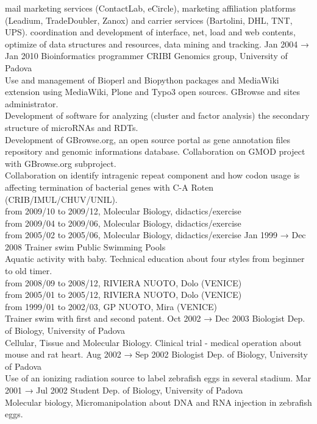 \documentclass[8pt]{stackoverflow-upgraded-version} %
\begin{document}
\begin{entrylist}
{		mail marketing services (ContactLab, eCircle), marketing affiliation platforms (Leadium, TradeDoubler, Zanox) and carrier services (Bartolini, DHL, TNT, UPS).
		 coordination and development of interface, net, load and web contents, optimize of data structures and resources, data mining and tracking.}
	\entry
		{Jan 2004 → Jan 2010}
		{Bioinformatics programmer}
		{CRIBI Genomics group, University of Padova}
		{\\
		Use and management of Bioperl and Biopython packages and MediaWiki extension using MediaWiki, Plone and Typo3 open sources. GBrowse and sites administrator.\\
		Development of software for analyzing (cluster and factor analysis) the secondary structure of microRNAs and RDTs.\\
		Development of GBrowse.org, an open source portal as gene annotation files repository and genomic informations database.
		Collaboration on GMOD project with GBrowse.org subproject.\\
		Collaboration on identify intragenic repeat component and how codon usage is affecting termination of bacterial genes with C-A Roten (CRIB/IMUL/CHUV/UNIL).\\
		from 2009/10 to 2009/12, Molecular Biology, didactics/exercise\\
		from 2009/04 to 2009/06, Molecular Biology, didactics/exercise\\
		from 2005/02 to 2005/06, Molecular Biology, didactics/exercise}
	\entry
		{Jan 1999 → Dec 2008}
		{Trainer swim}
		{Public Swimming Pools}
		{\\
		Aquatic activity with baby. Technical education about four styles from beginner to old timer.\\
		from 2008/09 to 2008/12, RIVIERA NUOTO, Dolo (VENICE)\\
		from 2005/01 to 2005/12, RIVIERA NUOTO, Dolo (VENICE)\\
		from 1999/01 to 2002/03, GP NUOTO, Mira (VENICE)\\
		Trainer swim with first and second patent.}
	\entry
		{Oct 2002 → Dec 2003}
		{Biologist}
		{Dep. of Biology, University of Padova}
		{\\
		Cellular, Tissue and Molecular Biology. Clinical trial - medical operation about mouse and rat heart.}
	\entry
		{Aug 2002 → Sep 2002}
		{Biologist}
		{Dep. of Biology, University of Padova}
		{\\
		Use of an ionizing radiation source to label zebrafish eggs in several stadium.}
	\entry
		{Mar 2001 → Jul 2002}
		{Student}
		{Dep. of Biology, University of Padova}
		{\\
		Molecular biology, Micromanipolation about DNA and RNA injection in zebrafish eggs.}
\end{entrylist}
\end{document}
